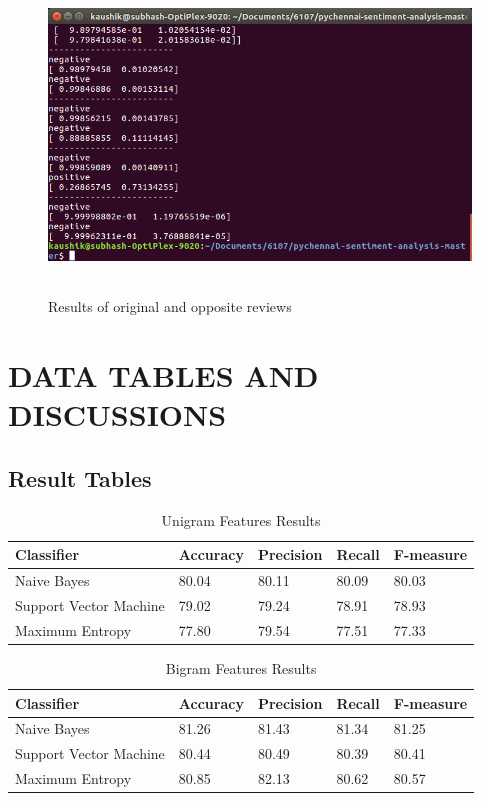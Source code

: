\documentclass[oneside,a4paper,12pt]{pictreport}
\begin{document}
\begin{figure}[!h]
\includegraphics[width=5.5in,height=3.3in]{screenshot_1.png}
\caption{Results of original and opposite reviews}
\end{figure}


\chapter{DATA TABLES AND DISCUSSIONS} 


\section{Result Tables}

\begin{table}[h!]
\centering
\caption{Unigram Features Results}
\label{my-label}
\begin{tabular}{|l|l|l|l|l|}
\hline
\textbf{Classifier} & \textbf{Accuracy} & \textbf{Precision} & \textbf{Recall} & \textbf{F-measure}\\ \hline
Naive Bayes          & 80.04  & 80.11 & 80.09 & 80.03                   \\ \hline
Support Vector Machine          & 79.02  & 79.24 & 78.91 & 78.93                   \\ \hline
Maximum Entropy          & 77.80  & 79.54 & 77.51 & 77.33 \\ \hline
\end{tabular}
\end{table}



\begin{table}[h!]
\centering
\caption{Bigram Features Results}
\label{my-label}
\begin{tabular}{|l|l|l|l|l|}
\hline
\textbf{Classifier} & \textbf{Accuracy} & \textbf{Precision} & \textbf{Recall} & \textbf{F-measure}\\ \hline
Naive Bayes          & 81.26  & 81.43 & 81.34 & 81.25                   \\ \hline
Support Vector Machine          & 80.44  & 80.49 & 80.39 & 80.41                   \\ \hline
Maximum Entropy          & 80.85  & 82.13 & 80.62 & 80.57 \\ \hline
\end{tabular}
\end{table}
\end{document}
